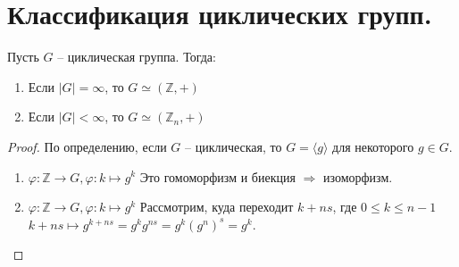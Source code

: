 \section{Классификация циклических групп.}

\begin{statement}
    Пусть $G$ -- циклическая группа. Тогда:
    \begin{enumerate}
        \item Если $|G| = \infty$, то $G \simeq (\mathbb{Z}, +)$
        \item Если $|G| < \infty$, то $G \simeq (\mathbb{Z}_n, +)$
    \end{enumerate}
    \begin{proof}
        По определению, если $G$ -- циклическая, то $G = \langle g \rangle$ для некоторого $g \in G$.
        \begin{enumerate}
            \item $\varphi : \mathbb{Z} \to G, \varphi : k \mapsto g^k$ \newline Это гомоморфизм и биекция $\Rightarrow$ изоморфизм.
            \item $\varphi : \mathbb{Z} \to G, \varphi : k \mapsto g^k$ \newline Рассмотрим, куда переходит $k + ns$, где $0 \leqslant k \leqslant n - 1$ \newline $k + ns \mapsto g^{k + ns} = g^k g^{ns} = g^k(g^n)^s = g^k$.
        \end{enumerate}
    \end{proof}
\end{statement}